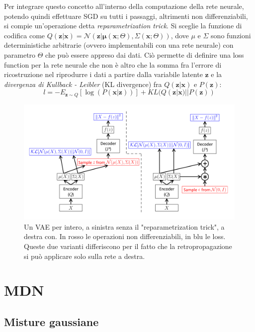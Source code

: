 Per integrare questo concetto all'interno della computazione della rete neurale, potendo quindi effettuare SGD su tutti i passaggi, altrimenti non differenziabili, si compie un'operazione detta \textit{reparametrization trick}. Si sceglie la funzione di codifica come $Q(\boldsymbol{z} | \boldsymbol{x}) = \mathcal{N}(\boldsymbol{z} | \boldsymbol{\mu}(\boldsymbol{x}; \Theta), \Sigma(\boldsymbol{x}; \Theta))$, dove $\mu$ e $\Sigma$ sono funzioni deterministiche arbitrarie (ovvero implementabili con una rete neurale) con parametro $\Theta$ che può essere appreso dai dati. Ciò permette di definire una loss function per la rete neurale che non è altro che la somma fra l'errore di ricostruzione nel riprodurre i dati a partire dalla variabile latente $\boldsymbol{z}$ e la \textit{divergenza di Kullback - Leibler} (KL divergence) fra $Q(\boldsymbol{z} | \boldsymbol{x})$ e $P(\boldsymbol{z})$:
\begin{equation}
	\label{vae_loss}
	l = -E_{\boldsymbol{z}\sim Q}[\log(P(\boldsymbol{x} | \boldsymbol{z}))] + KL(Q(\boldsymbol{z} | \boldsymbol{x}) || P(\boldsymbol{z}))
\end{equation}
\begin{figure}[ht]
	\centering
	\includegraphics[width=\textwidth]{img/vae_struct.png}
	\caption{Un VAE per intero, a sinistra senza il "reparametrization trick", a destra con. In rosso le operazioni non differenziabili, in blu le loss. Queste due varianti differiscono per il fatto che la retropropagazione si può applicare solo sulla rete a destra.}
	\label{fig:1.14}
\end{figure}
\section{MDN}
\subsection{Misture gaussiane} %
\label{sub:misture_gaussiane}

